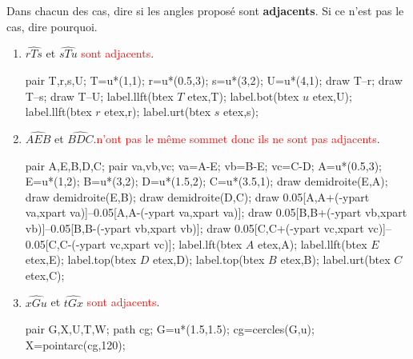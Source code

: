\begin{corrige}
    Dans chacun des cas, dire si les angles proposé sont \textbf{adjacents}. Si ce n'est pas le cas, dire pourquoi.
    \begin{enumerate}
        \item $\widehat{rTs}$ et $\widehat{sTu}$ \textcolor{red}{sont adjacents}.\par
        \hspace*{-5mm}
        \begin{Geometrie}[CoinHD={(4u,4u)}]
            pair T,r,s,U;
            T=u*(1,1);
            r=u*(0.5,3);
            s=u*(3,2);
            U=u*(4,1);
            draw T--r;
            draw T--s;
            draw T--U;
            label.llft(btex $T$ etex,T);
            label.bot(btex $u$ etex,U);
            label.llft(btex $r$ etex,r);
            label.urt(btex $s$ etex,s);
        \end{Geometrie}
        \item $\widehat{AEB}$ et $\widehat{BDC}$.\textcolor{red}{n'ont pas le même sommet donc ils ne sont pas adjacents}.\par
        \hspace*{-5mm}
        \begin{Geometrie}[CoinHD={(4u,4u)}]
            pair A,E,B,D,C;
            pair va,vb,vc;
            va=A-E;
            vb=B-E;
            vc=C-D;
            A=u*(0.5,3);
            E=u*(1,2);
            B=u*(3,2);
            D=u*(1.5,2);
            C=u*(3.5,1);            
            draw demidroite(E,A);
            draw demidroite(E,B);
            draw demidroite(D,C);
            draw 0.05[A,A+(-ypart va,xpart va)]--0.05[A,A-(-ypart va,xpart va)];
            draw 0.05[B,B+(-ypart vb,xpart vb)]--0.05[B,B-(-ypart vb,xpart vb)];
            draw 0.05[C,C+(-ypart vc,xpart vc)]--0.05[C,C-(-ypart vc,xpart vc)];
            label.lft(btex $A$ etex,A);
            label.llft(btex $E$ etex,E);
            label.top(btex $D$ etex,D);
            label.top(btex $B$ etex,B);
            label.urt(btex $C$ etex,C);
        \end{Geometrie}
        \item $\widehat{xGu}$ et $\widehat{tGx}$ \textcolor{red}{sont adjacents}.\par
        \hspace*{-5mm}
        \begin{Geometrie}[CoinHD={(4u,3.5u)}]
            pair G,X,U,T,W;
            path cg;
            G=u*(1.5,1.5);
            cg=cercles(G,u);
            X=pointarc(cg,120);

\end{Geometrie}
\end{enumerate}
\end{corrige}
